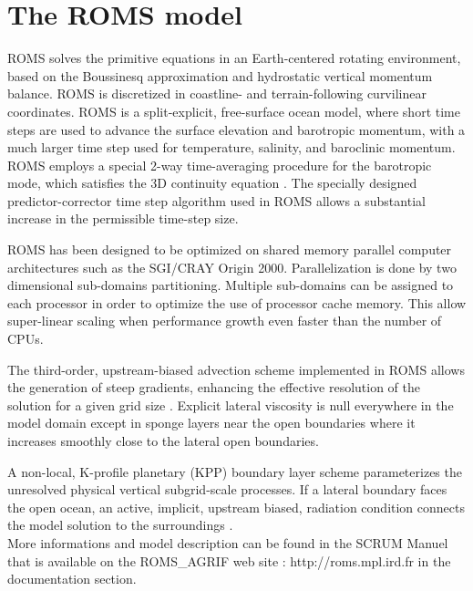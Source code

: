 \section{The ROMS model}

ROMS solves the primitive equations in an Earth-centered rotating environment, based
on the Boussinesq approximation and hydrostatic vertical momentum balance. ROMS is
discretized in coastline- and terrain-following curvilinear coordinates.  ROMS is a
split-explicit, free-surface ocean model, where short time steps are used to advance
the surface elevation and barotropic momentum, with a much larger time step used for
temperature, salinity, and baroclinic momentum.  ROMS employs a special 2-way
time-averaging procedure for the barotropic mode, which satisfies the 3D continuity
equation \citep{Shc03b}.  The specially designed predictor-corrector time step
algorithm used in ROMS allows a substantial increase in the permissible time-step
size.

ROMS has been designed to be optimized on shared memory parallel computer
architectures such as the SGI/CRAY Origin 2000. Parallelization is done by two
dimensional sub-domains partitioning. Multiple sub-domains can be assigned to each
processor in order to optimize the use of processor cache memory. This allow
super-linear scaling when performance growth even faster than the number of CPUs.

The third-order, upstream-biased advection scheme implemented in ROMS allows the
generation of steep gradients, enhancing the effective resolution of the solution for
a given grid size \citep{Shc98}. Explicit lateral viscosity is null everywhere in the
model domain except in sponge layers near the open boundaries where it increases
smoothly close to the lateral open boundaries.

A non-local, K-profile planetary (KPP) boundary layer scheme \citep{Lar94}
parameterizes the unresolved physical vertical subgrid-scale processes.  If a lateral
boundary faces the open ocean, an active, implicit, upstream biased, radiation
condition connects the
model solution to the surroundings \citep{Mar01}. \\

More informations and model description can be found in the SCRUM Manuel
\citep{hedstroem97} that is available on the ROMS\_AGRIF web site :
http://roms.mpl.ird.fr in the documentation section.
